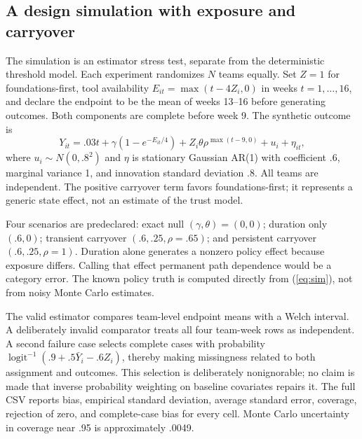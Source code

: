 \documentclass[11pt]{article}
\begin{document}
\subsection{A design simulation with exposure and carryover}
The simulation is an estimator stress test, separate from the deterministic threshold model. Each experiment randomizes $N$ teams equally. Set $Z=1$ for foundations-first, tool availability $E_{it}=\max(t-4Z_i,0)$ in weeks $t=1,\ldots,16$, and declare the endpoint to be the mean of weeks 13--16 before generating outcomes. Both components are complete before week 9. The synthetic outcome is
\begin{equation}
 Y_{it}=.03t+\gamma(1-e^{-E_{it}/4})
 +Z_i\theta\rho^{\max(t-9,0)}+u_i+\eta_{it},\label{eq:sim}
\end{equation}
where $u_i\sim N(0,.8^2)$ and $\eta$ is stationary Gaussian AR(1) with coefficient $.6$, marginal variance 1, and innovation standard deviation $.8$. All teams are independent. The positive carryover term favors foundations-first; it represents a generic state effect, not an estimate of the trust model.

Four scenarios are predeclared: exact null $(\gamma,\theta)=(0,0)$; duration only $(.6,0)$; transient carryover $(.6,.25,\rho=.65)$; and persistent carryover $(.6,.25,\rho=1)$. Duration alone generates a nonzero policy effect because exposure differs. Calling that effect permanent path dependence would be a category error. The known policy truth is computed directly from (\ref{eq:sim}), not from noisy Monte Carlo estimates.

The valid estimator compares team-level endpoint means with a Welch interval. A deliberately invalid comparator treats all four team-week rows as independent. A second failure case selects complete cases with probability $\operatorname{logit}^{-1}(.9+.5\bar Y_i-.6Z_i)$, thereby making missingness related to both assignment and outcomes. This selection is deliberately nonignorable; no claim is made that inverse probability weighting on baseline covariates repairs it. The full CSV reports bias, empirical standard deviation, average standard error, coverage, rejection of zero, and complete-case bias for every cell. Monte Carlo uncertainty in coverage near .95 is approximately .0049.
\end{document}
